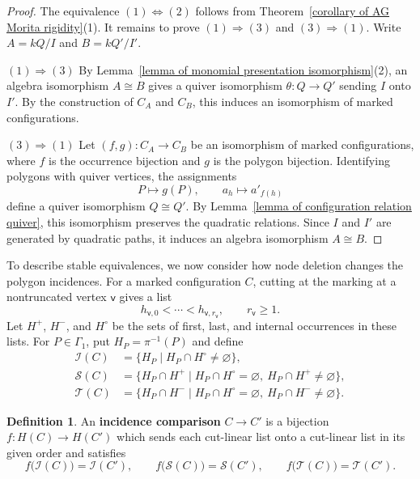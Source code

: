 \documentclass[11pt]{article}
\newcommand{\vv}{\mathsf{v}}
\theoremstyle{definition}
\newtheorem{definition}[theorem]{Definition}
\begin{document}
		\begin{proof}
			The equivalence $(1)\Leftrightarrow(2)$ follows from Theorem~\ref{corollary of AG Morita rigidity}(1). It remains to prove $(1)\Rightarrow(3)$ and $(3)\Rightarrow(1)$. Write $A=kQ/I$ and $B=kQ'/I'$.

			\noindent\underline{$(1)\Rightarrow(3)$}
			By Lemma~\ref{lemma of monomial presentation isomorphism}(2), an algebra isomorphism $A\cong B$ gives a quiver isomorphism $\theta:Q\to Q'$ sending $I$ onto $I'$. By the construction of $C_A$ and $C_B$, this induces an isomorphism of marked configurations.

			\noindent\underline{$(3)\Rightarrow(1)$}
			Let $(f,g):C_A\to C_B$ be an isomorphism of marked configurations, where $f$ is the occurrence bijection and $g$ is the polygon bijection. Identifying polygons with quiver vertices, the assignments
			\[
				P\longmapsto g(P),\qquad a_h\longmapsto a'_{f(h)}
			\]
			define a quiver isomorphism $Q\cong Q'$. By Lemma~\ref{lemma of configuration relation quiver}, this isomorphism preserves the quadratic relations. Since $I$ and $I'$ are generated by quadratic paths, it induces an algebra isomorphism $A\cong B$.
		\end{proof}

		To describe stable equivalences, we now consider how node deletion changes the polygon incidences.
		For a marked configuration $C$, cutting at the marking at a nontruncated vertex $\vv$ gives a list
		\[
			h_{\vv,0}<\cdots<h_{\vv,r_\vv},\qquad r_\vv\geq1.
		\]
		Let $H^+$, $H^-$, and $H^\circ$ be the sets of first, last, and internal occurrences in these lists. For $P\in\Gamma_1$, put $H_P=\pi^{-1}(P)$ and define
		\[
			\begin{aligned}
				\mathscr I(C)&=\{H_P\mid H_P\cap H^\circ\ne\varnothing\},\\
				\mathscr S(C)&=\{H_P\cap H^+\mid H_P\cap H^\circ=\varnothing,
				\ H_P\cap H^+\ne\varnothing\},\\
				\mathscr T(C)&=\{H_P\cap H^-\mid H_P\cap H^\circ=\varnothing,
				\ H_P\cap H^-\ne\varnothing\}.
			\end{aligned}
		\]

		\begin{definition}\label{definition of incidence comparison}
			An \textbf{incidence comparison} $C\to C'$ is a bijection $f:H(C)\to H(C')$ which sends each cut-linear list onto a cut-linear list in its given order and satisfies
			\[
				f\bigl(\mathscr I(C)\bigr)=\mathscr I(C'),\qquad
				f\bigl(\mathscr S(C)\bigr)=\mathscr S(C'),\qquad
				f\bigl(\mathscr T(C)\bigr)=\mathscr T(C').
			\]
		\end{definition}
\end{document}
